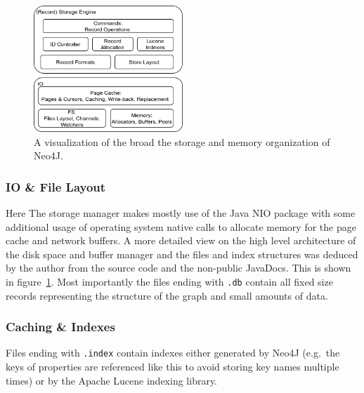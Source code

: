     \begin{figure}[htp]
    \begin{center}
    \includegraphics[keepaspectratio,width=0.5\textwidth,height=0.3\textheight]{img/00_intro/N4J_Storage.png}
    \end{center}
    \caption{A visualization of the broad the storage and memory organization of Neo4J.} \label{N4J_Storage}
    \end{figure}
    
    \subsubsection*{IO \& File Layout}\label{files_sec}
    Here The storage manager makes mostly use of the Java NIO package with some additional usage of operating system native calls to allocate memory for the page cache and network buffers. 
    A more detailed view on the high level architecture of the disk space and buffer manager and the files and index structures was deduced by the author from the source code and the non-public JavaDocs.
    This is shown in figure~\ref{N4J_Storage}.
    Most importantly the files ending with \texttt{.db} contain all fixed size records representing the structure of the graph and small amounts of data.
    
    \subsubsection*{Caching \& Indexes} 
    Files ending with \texttt{.index} contain indexes either generated by Neo4J (e.g.\ the keys of properties are referenced like this to avoid storing key names multiple times) or by the Apache Lucene indexing library.
    
